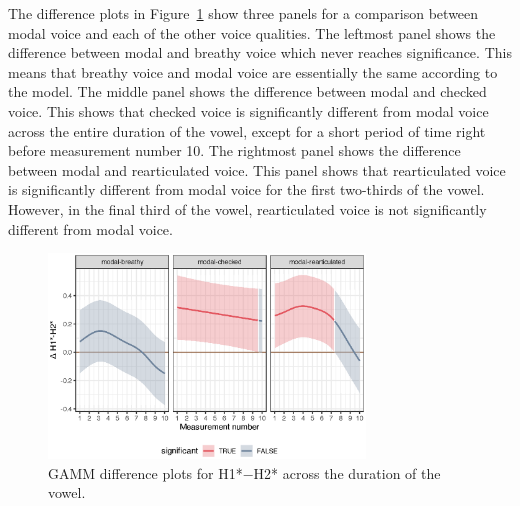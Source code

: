 The difference plots in Figure~\ref{fig:h1h2_model_diff} show three panels for a comparison between modal voice and each of the other voice qualities. The leftmost panel shows the difference between modal and breathy voice which never reaches significance. This means that breathy voice and modal voice are essentially the same according to the model. The middle panel shows the difference between modal and checked voice. This shows that checked voice is significantly different from modal voice across the entire duration of the vowel, except for a short period of time right before measurement number 10. The rightmost panel shows the difference between modal and rearticulated voice. This panel shows that rearticulated voice is significantly different from modal voice for the first two-thirds of the vowel. However, in the final third of the vowel, rearticulated voice is not significantly different from modal voice.
\begin{figure}[h!]
  \centering
  \includegraphics[width = 0.75\textwidth]{images/SpectralSlopes_GAMMs/h1h2_model_diff.eps}
  \caption{GAMM difference plots for H1*$-$H2* across the duration of the vowel.}
  \label{fig:h1h2_model_diff}
\end{figure}

